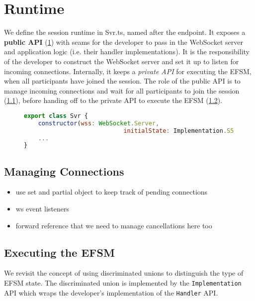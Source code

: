 \section{Runtime}
\label{section:noderuntime}

We define the session runtime in Svr.ts,
named after the  endpoint.
It exposes a \textbf{public API}
(\cref{lst:noderuntimepublicapi})
with seams for the developer to pass in the WebSocket server 
and application logic
(i.e. their handler implementations).
It is the responsibility of the developer to construct the
WebSocket server and set it up to listen for incoming connections.
Internally, it keeps a \textit{private API}
for executing the EFSM, when all participants have 
joined the session.
The role of the public API is to manage incoming connections and
wait for all participants to join the session 
(\cref{subsection:noderuntimepublic}), before
handing off to the private API to execute the EFSM
(\cref{subsection:noderuntimeprivate}).

\begin{figure}[!h]
\begin{lstlisting}[language=javascript,tabsize=2,title=Svr.ts]
export class Svr {
	constructor(wss: WebSocket.Server,
							initialState: Implementation.S51) { ... }
	...
}
\end{lstlisting}
\label{lst:noderuntimepublicapi}
\end{figure}

\subsection{Managing Connections}
\label{subsection:noderuntimepublic}

\begin{itemize}
\item use set and partial object to keep track of pending connections
\item ws event listeners
\item forward reference that we need to manage cancellations here too
\end{itemize}

\subsection{Executing the EFSM}
\label{subsection:noderuntimeprivate}

We revisit the concept of using discriminated unions to distinguish
the type of EFSM state. The discriminated union is implemented by the
\texttt{Implementation} API which wraps the developer's
implementation of the  \texttt{Handler} API.

